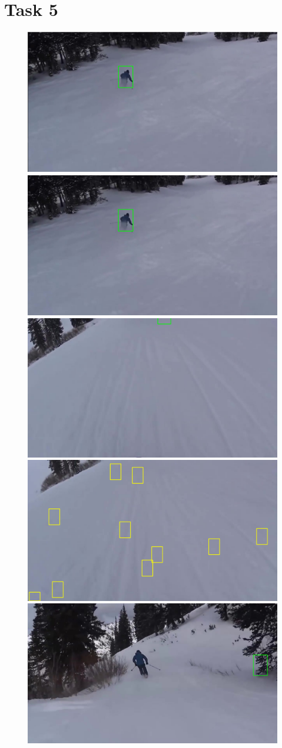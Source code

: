 \documentclass[9pt]{IEEEtran}
\begin{document}
\section{Task 5}
\begin{figure}[H]
    \centering
    \includegraphics[width=0.48\columnwidth]{../figs/1_frame_50.png} \hfill %
    \includegraphics[width=0.48\columnwidth]{../figs/2_frame_50.png} \\ %
    \vspace{1ex} %
    \includegraphics[width=0.48\columnwidth]{../figs/1_frame_271.png} \hfill %
    \includegraphics[width=0.48\columnwidth]{../figs/2_frame_260.png} \\ %
    \vspace{1ex} %
    \includegraphics[width=0.48\columnwidth]{../figs/1_frame_372.png} \hfill %

\end{figure}
\end{document}
